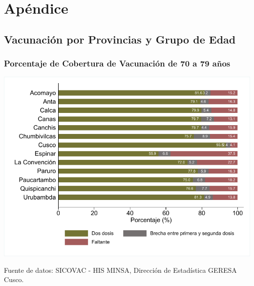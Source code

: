 \documentclass[xcolor=table]{beamer}
\begin{document}
\appendix
\section{Apéndice}

\subsection{Vacunación por Provincias y Grupo de Edad}

\begin{frame}[label=vacunas_70]
	\frametitle{Porcentaje de Cobertura de Vacunación de 70 a 79 años}
	\vspace{-.5cm}
	\begin{center}
		\includegraphics[width=0.8\linewidth, trim={.2cm .5cm .2cm .2cm},clip]{../figuras/vacunacion_provincial_edad_7.pdf}
	\end{center}
	{\tiny Fuente de datos: SICOVAC - HIS MINSA, Dirección de Estadística GERESA Cusco. \\}
\hyperlink{cobertura_vacuna_provincias}{}
\end{frame}
\end{document}
